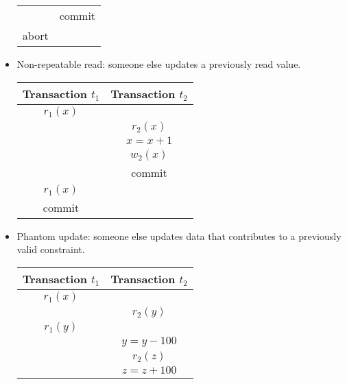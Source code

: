 \begin{itemize}
\begin{table}[H]
\begin{tabular}{c|c}
                                    & commit                     \\
            abort                      &                           
            \end{tabular}
        \end{table}
    \item Non-repeatable read: someone else updates a previously read value.
        \begin{table}[H]
            \centering
            \begin{tabular}{c|c}
            \textbf{Transaction $t_1$}  & \textbf{Transaction $t_2$} \\ \hline
            $r_1(x)$                    &                            \\
                                        & $r_2(x)$                   \\
                                        & $x=x+1$                    \\
                                        & $w_2(x)$                   \\
                                        & commit                     \\
            $r_1(x)$                    &                            \\
            commit                      & \multicolumn{1}{l}{}      
            \end{tabular}
        \end{table}
    \item Phantom update: someone else updates data that contributes to a previously valid constraint. 
        \begin{table}[H]
            \centering
            \begin{tabular}{c|c}
            \textbf{Transaction $t_1$} & \textbf{Transaction $t_2$} \\ \hline
            $r_1(x)$                   &                            \\
                                        & $r_2(y)$                   \\
            $r_1(y)$                   &                            \\
                                        & $y=y-100$                  \\
                                        & $r_2(z)$                   \\
                                        & $z=z+100$                  \\

\end{tabular}
\end{table}
\end{itemize}
